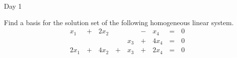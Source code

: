 \begin{applicationActivities}{Day 1}
\begin{activity}{0}
  Find a basis for the solution set of the following homogeneous linear
  system.
  \begin{alignat*}{5}
    x_1 &\,+\,& 2x_2 &\, \,&     &\,-\,&  x_4 &\,=\,& 0 \\
        &\, \,&      &\, \,& x_3 &\,+\,& 4x_4 &\,=\,& 0 \\
   2x_1 &\,+\,& 4x_2 &\,+\,& x_3 &\,+\,& 2x_4 &\,=\,& 0 \\
  \end{alignat*}
\end{activity}




\end{applicationActivities}
